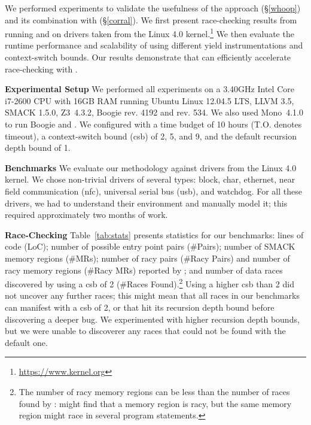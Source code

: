We performed experiments to validate the usefulness of the \whoop approach (\S\ref{whoop}) and its combination with \corral (\S\ref{corral}). We first present race-checking results from running \whoop and \corral on \sizeOfBenchmarks drivers taken from the Linux 4.0 kernel.\footnote{\url{https://www.kernel.org}} We then evaluate the runtime performance and scalability of \corral using different yield instrumentations and context-switch bounds. Our results demonstrate that \whoop can efficiently accelerate race-checking with \corral.



\noindent\textbf{Experimental Setup }
%
We performed all experiments on a 3.40GHz Intel Core i7-2600 CPU with 16GB RAM running Ubuntu Linux 12.04.5 LTS, LLVM 3.5, SMACK 1.5.0, Z3~4.3.2, Boogie rev. 4192 and \corral rev. 534. We also used Mono~4.1.0 to run Boogie and \corral. We configured \corral with a time budget of 10 hours (T.O. denotes timeout), a context-switch bound (csb) of 2, 5, and 9, and the default recursion depth bound of 1.

\noindent\textbf{Benchmarks }
%
We evaluate our methodology against \sizeOfBenchmarks drivers from the Linux 4.0 kernel. We chose non-trivial drivers of several types: block, char, ethernet, near field communication (nfc), universal serial bus (usb), and watchdog. For all these drivers, we had to understand their environment and manually model it; this required approximately two months of work.

\noindent\textbf{Race-Checking }
%
Table~\ref{tab:stats} presents statistics for our benchmarks: lines of code (LoC); number of possible entry point pairs (\#Pairs); number of SMACK memory regions (\#MRs); number of racy pairs (\#Racy Pairs) and number of racy memory regions (\#Racy MRs) reported by \whoop; and number of data races discovered by \corral using a csb of 2 (\#Races Found).\footnote{The number of racy memory regions can be less than the number of races found by \corral: \whoop might find that a memory region is racy, but the same memory region might race in several program statements.} Using a higher csb than 2 did not uncover any further races; this might mean that all races in our benchmarks can manifest with a csb of 2, or that \corral hit its recursion depth bound before discovering a deeper bug. We experimented with higher recursion depth bounds, but we were unable to discoverer any races that could not be found with the default one.

